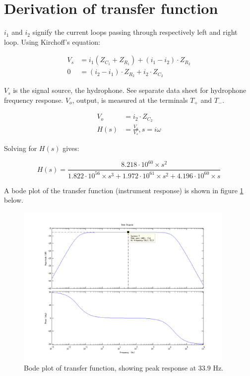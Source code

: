 \documentclass[a4paper]{article}
\begin{document}
\section{Derivation of transfer function}

$i_1$ and $i_2$ signify the current loops passing through respectively left
and right loop. Using Kirchoff's equation:

\begin{align}
  \label{eqn:currents_1}
  V_s &= i_1 (Z_{C_1} + Z_{R_1}) + (i_1 - i_2) \cdot Z_{R_2} \\
  0   &= (i_2 - i_1) \cdot Z_{R_2} + i_2 \cdot Z_{C_2}
  \label{eqn:currents_2}
\end{align}

$V_s$ is the signal source, the hydrophone. See separate data sheet for
hydrophone frequency response. $V_o$, output, is measured at the
terminals $T_+$ and $T_-$.

\begin{align}
  \label{eqn:vo}
  V_o &= i_2 \cdot Z_{C_2} \\
  H(s) &= \frac{V_o}{V_s}, s = i\omega
\end{align}

Solving for $H(s)$ gives:

\begin{equation}
  H(s) = \frac{8.218 \cdot 10^{60} \times s^2}
  {1.822 \cdot 10^{56} \times s^3 +
   1.972 \cdot 10^{61} \times s^2 +
   4.196 \cdot 10^{60} \times s}
  \label{eqn:transferfunction}
\end{equation}

A bode plot of the transfer function (instrument response) is shown in
figure \ref{fig:bodeplot} below.
\begin{figure}[h!]
  \begin{center}
    \includegraphics[width=400px]{bodeplot.png}
  \end{center}
  \caption{Bode plot of transfer function, showing peak response at
  $33.9$ Hz.}
  \label{fig:bodeplot}
\end{figure}
\end{document}
